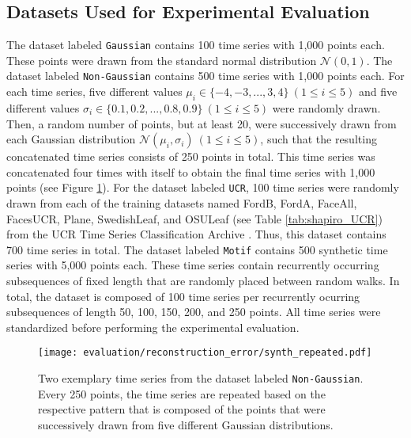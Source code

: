 \subsection*{Datasets Used for Experimental Evaluation}
The dataset labeled \texttt{Gaussian} contains 100 time series with 1,000 points each. These points were drawn from the standard normal distribution $\mathcal{N}(0,1)$. \newline
The dataset labeled \texttt{Non-Gaussian} contains 500 time series with 1,000 points each. For each time series, five different values $\mu_i \in \{-4, -3, ..., 3, 4\} \ (1 \leq i \leq 5)$ and five different values $\sigma_i \in \{0.1, 0.2, ..., 0.8, 0.9\} \ (1 \leq i \leq 5)$ were randomly drawn. Then, a random number of points, but at least 20, were successively drawn from each Gaussian distribution $\mathcal{N}(\mu_i,\sigma_i) \ (1 \leq i \leq 5)$, such that the resulting concatenated time series consists of 250 points in total. This time series was concatenated four times with itself to obtain the final time series with 1,000 points (see Figure \ref{fig:synth_repeated}). \newline
For the dataset labeled \texttt{UCR}, 100 time series were randomly drawn from each of the training datasets named FordB, FordA, FaceAll, FacesUCR, Plane, SwedishLeaf, and OSULeaf (see Table \ref{tab:shapiro_UCR}) from the UCR Time Series Classification Archive \cite{UCR_Archive}. Thus, this dataset contains 700 time series in total. \newline
The dataset labeled \texttt{Motif} contains 500 synthetic time series with 5,000 points each. These time series contain recurrently occurring subsequences of fixed length that are randomly placed between random walks. In total, the dataset is composed of 100 time series per recurrently ocurring subsequences of length 50, 100, 150, 200, and 250 points. \newline
All time series were standardized before performing the experimental evaluation.
\begin{figure}[htb]
\centering
\texttt{[image: evaluation/reconstruction\_error/synth\_repeated.pdf]}
\caption[Reconstruction Error - Synthetic Repeating Time Series]{Two exemplary time series from the dataset labeled \texttt{Non-Gaussian}. Every 250 points, the time series are repeated based on the respective pattern that is composed of the points that were successively drawn from five different Gaussian distributions.}
\label{fig:synth_repeated}
\end{figure}
